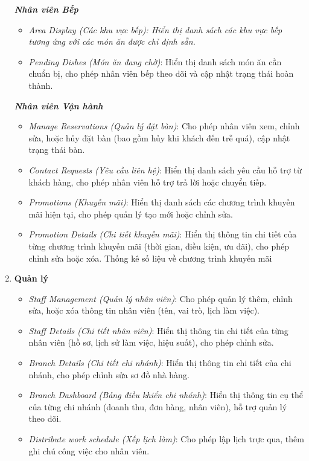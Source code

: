 \begin{enumerate}
        \textit{\textbf{Nhân viên Bếp}}
        \begin{itemize}
            \item \textit{Area Display (Các khu vực bếp): Hiển thị danh sách các khu vực bếp tương ứng với các món ăn được chỉ định sẵn.}
            \item \textit{Pending Dishes (Món ăn đang chờ)}: Hiển thị danh sách món ăn cần chuẩn bị, cho phép nhân viên bếp theo dõi và cập nhật trạng thái hoàn thành.
        \end{itemize}
            
        \textit{\textbf{Nhân viên Vận hành}}
        \begin{itemize}
            \item \textit{Manage Reservations (Quản lý đặt bàn)}: Cho phép nhân viên xem, chỉnh sửa, hoặc hủy đặt bàn (bao gồm hủy khi khách đến trễ quá), cập nhật trạng thái bàn.
            \item \textit{Contact Requests (Yêu cầu liên hệ)}: Hiển thị danh sách yêu cầu hỗ trợ từ khách hàng, cho phép nhân viên hỗ trợ trả lời hoặc chuyển tiếp.
            \item \textit{Promotions (Khuyến mãi)}: Hiển thị danh sách các chương trình khuyến mãi hiện tại, cho phép quản lý tạo mới hoặc chỉnh sửa.
            \item \textit{Promotion Details (Chi tiết khuyến mãi)}: Hiển thị thông tin chi tiết của từng chương trình khuyến mãi (thời gian, điều kiện, ưu đãi), cho phép chỉnh sửa hoặc xóa. Thống kê số liệu về chương trình khuyến mãi
        \end{itemize}
    \item \textbf{Quản lý}
        \begin{itemize}
            \item \textit{Staff Management (Quản lý nhân viên)}: Cho phép quản lý thêm, chỉnh sửa, hoặc xóa thông tin nhân viên (tên, vai trò, lịch làm việc).
            \item \textit{Staff Details (Chi tiết nhân viên)}: Hiển thị thông tin chi tiết của từng nhân viên (hồ sơ, lịch sử làm việc, hiệu suất), cho phép chỉnh sửa.
            \item \textit{Branch Details (Chi tiết chi nhánh)}: Hiển thị thông tin chi tiết của chi nhánh, cho phép chỉnh sửa sơ đồ nhà hàng.
            \item \textit{Branch Dashboard (Bảng điều khiển chi nhánh)}: Hiển thị thông tin cụ thể của từng chi nhánh (doanh thu, đơn hàng, nhân viên), hỗ trợ quản lý theo dõi.
            \item \textit{Distribute work schedule (Xếp lịch làm)}: Cho phép lập lịch trực qua, thêm ghi chú công việc cho nhân viên.
        \end{itemize}
        

\end{enumerate}
